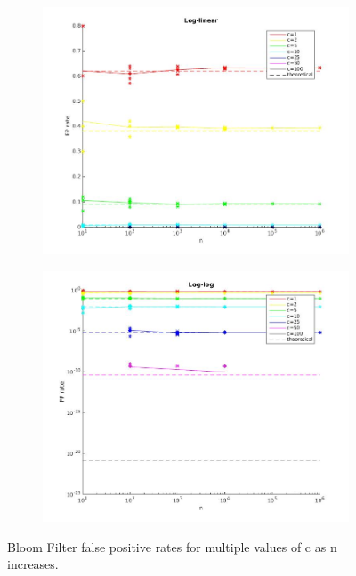 \documentclass[]{article}
\begin{document}
  \vspace{-4mm}
  \begin{figure}[H]
    \centering
    \begin{subfigure}{.49\textwidth}
      \centering
      \includegraphics[width=1\linewidth]{loglinear.jpg}
      \vspace{-9mm}
      \caption{}
    \end{subfigure}
    \begin{subfigure}{.49\textwidth}
      \centering
      \includegraphics[width=1\linewidth]{loglog.jpg}
      \vspace{-9mm}
      \caption{}
    \end{subfigure}
    \vspace{-2mm}
    \caption{Bloom Filter false positive rates for multiple values of c as n increases.}
  \end{figure}
\end{document}
